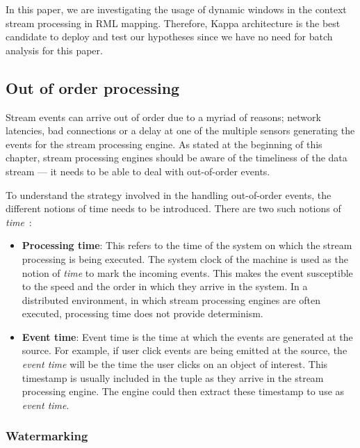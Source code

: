 In this paper, we are investigating the usage of dynamic windows in the context stream processing 
in RML mapping. 
Therefore, Kappa architecture is the best candidate to deploy and test our 
hypotheses since we have no need for batch analysis for this paper.  

\subsection{Out of order processing}%
\label{sub:Out of order processing}
Stream events can arrive out of order due to a myriad of reasons; network latencies, 
bad connections or a delay at one of the multiple sensors generating the events for 
the stream processing engine. As stated at the beginning of this chapter, stream 
processing engines should be aware of the timeliness of the data stream --- it needs 
to be able to deal with out-of-order events. 

To understand the strategy involved in the handling out-of-order events, 
the different notions of time needs to be introduced. There are two such notions 
of \emph{time}~\cite{watermark_flink}: 

\begin{itemize}
    \item \textbf{Processing time}: This refers to the time of the system on which 
        the stream processing is being executed. The system clock of the machine is used 
        as the notion of \emph{time} to mark the incoming events. This makes the event 
        susceptible to the speed and the order in which they arrive in the system. 
        In a distributed environment, in which stream processing engines are often 
        executed, processing time does not provide determinism. 

    \item \textbf{Event time}: Event time is the time at which the events are generated 
        at the source. For example, if user click events are being emitted at the
        source, the \emph{event time} will be the time the user clicks on an object of 
        interest. This timestamp is usually included in the tuple as they arrive 
        in the stream processing engine. The engine could then extract these 
        timestamp to use as \emph{event time}. 
\end{itemize}

\subsubsection{Watermarking}%
\label{ssub:Watermarking}


